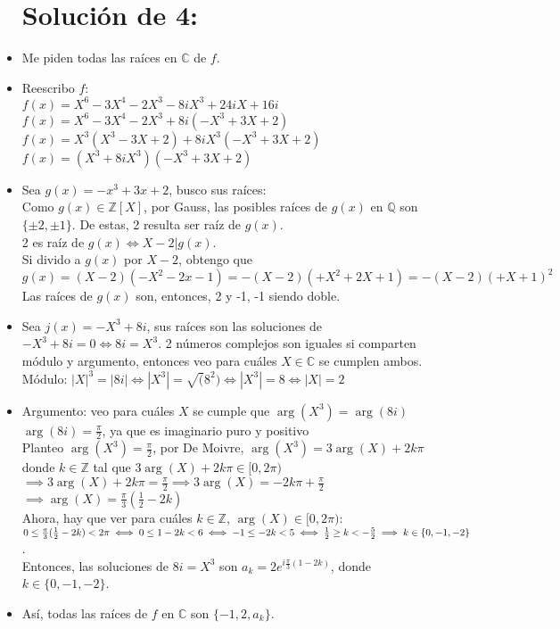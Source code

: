 \documentclass[12pt,twoside,a4paper]{exam}
\begin{document}
\begin{itemize}
\section*{Solución de 4:}
\item Me piden todas las raíces en $\mathbb{C}$ de $f$.
\item Reescribo $f$: \\
      $f(x)=X^6-3X^4-2X^3-8iX^3+24iX+16i$ \\
      $f(x)=X^6-3X^4-2X^3+8i(-X^3+3X+2)$  \\
      $f(x)=X^3(X^3-3X+2)+8iX^3(-X^3+3X+2)$ \\
      $f(x)=(X^3+8iX^3) (-X^3+3X+2)$\\
\item Sea $g(x)=-x^3+3x+2 $, busco sus raíces:\\
  Como $g(x) \in \mathbb{Z}[X]$, por Gauss, las posibles raíces de $g(x)$ en $\mathbb{Q}$ son $\{\pm 2,\pm 1\}$.
      De estas, 2 resulta ser raíz de $g(x)$.\\ 2 es raíz de $g(x) \iff X-2| g(x)$.\\
      Si divido a  $g(x)$ por  $X-2$, obtengo que $g(x)=(X-2)(-X^2-2x-1)=
      -(X-2) (+X^2+2X+1)= -(X-2) (+X+1)^2$\\ Las raíces de $g(x)$ son, entonces, 2 y -1, -1 siendo doble.
\item Sea  $j(x)=-X^3+8i$, sus raíces son las soluciones de $-X^3+8i=0 \iff 8i=X^3$.
      2 números complejos son iguales si comparten módulo y argumento, entonces
      veo para cuáles $X \in \mathbb{C}$ se cumplen ambos.\\
      Módulo: $|X|^3=|8i| \iff |X^3|=\sqrt(8^2) \iff |X^3|=8 \iff |X|=2$
\item Argumento: veo para cuáles $X$ se cumple que $\arg(X^3)=\arg(8i)$\\
      $\arg(8i)=\frac{\pi}{2}$, ya que es imaginario puro y positivo  \\
      Planteo $\arg(X^3)=\frac{\pi}{2}$, por De Moivre, $\arg(X^3)=3\arg(X)+2k\pi$
      donde $k \in \mathbb{Z}$ tal que $3\arg(X)+2k\pi \in [0,2\pi)$\\
      $\implies 3\arg(X)+2k\pi =  \frac{\pi}{2 } \implies 3\arg(X)=-2k\pi+\frac{\pi}{2 }$ 
      $\implies \arg(X)=\frac{\pi}{3}(\frac{1}{2}-2k)$\\ Ahora, hay que ver para
      cuáles $k \in \mathbb{Z} $, $\arg(X) \in [0,2\pi)$:\\
      $0 \leq \frac{\pi}{3}(\frac{1}{2}-2k) < 2\pi \iff 0\leq 1-2k < 6 \iff -1 \leq -2k < 5
      \\ \iff \frac{1}{2} \geq k < - \frac{ 5}{2} \implies k \in \{0,-1,-2\}$.\\
      Entonces, las soluciones de $8i=X^3$ son $a_k=2e^{i\frac{\pi}{3}(1-2k)}$,
      donde $k \in \{0,-1,-2\}$.
\item Así, todas las raíces de $f$ en $\mathbb{C}$ son $\{-1,2,a_k\}$.

\end{itemize}
\end{document}
